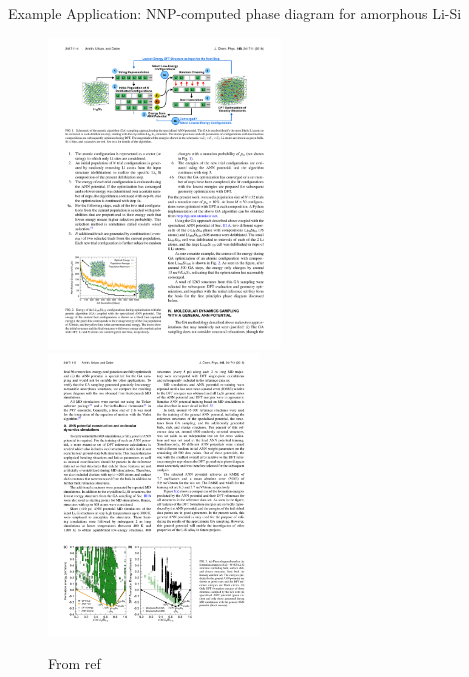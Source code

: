 \documentclass{beamer}
\begin{document}
\begin{frame}{Example Application: NNP-computed phase diagram for amorphous Li-Si}
\begin{figure}
    \centering
    \includegraphics[width=0.55\textwidth]{figures/li-si-nnp.pdf}
    \includegraphics[width=0.5\textwidth]{figures/li-si-nnp2.pdf}
    \caption{From ref \cite{artrithConstructingFirstprinciplesPhase2018}}
\end{figure}
\end{frame}
\end{document}
